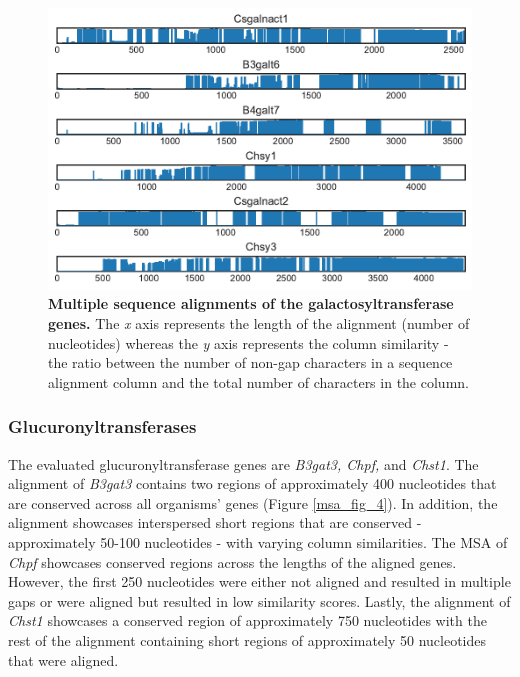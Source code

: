 \documentclass{article}
\begin{document}
\begin{figure}
\centering
\includegraphics[width=\textwidth]{./images/galactosyltransferase_msa.pdf}
\caption{\textbf{Multiple sequence alignments of the galactosyltransferase genes.} The \textit{x} axis represents the length of the alignment (number of nucleotides) whereas the \textit{y} axis represents the column similarity - the ratio between the number of non-gap characters in a sequence alignment column and the total number of characters in the column.}
\label{msa_fig_3}
\end{figure}

\subsubsection{Glucuronyltransferases}
The evaluated glucuronyltransferase genes are \textit{B3gat3, Chpf,} and \textit{Chst1}. The alignment of \textit{B3gat3} contains two regions of approximately 400 nucleotides that are conserved across all organisms' genes (Figure \ref{msa_fig_4}). In addition, the alignment showcases interspersed short regions that are conserved - approximately 50-100 nucleotides - with varying column similarities. The MSA of \textit{Chpf} showcases conserved regions across the lengths of the aligned genes. However, the first 250 nucleotides were either not aligned and resulted in multiple gaps or were aligned but resulted in low similarity scores. Lastly, the alignment of \textit{Chst1} showcases a conserved region of approximately 750 nucleotides with the rest of the alignment containing short regions of approximately 50 nucleotides that were aligned.
\end{document}
